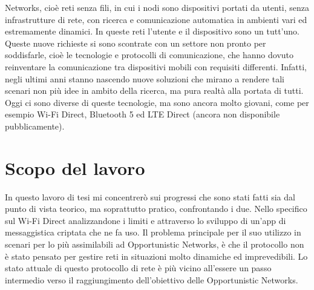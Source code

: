 Networks, cioè reti senza fili, in cui i nodi sono dispositivi portati da utenti, senza
infrastrutture di rete, con ricerca e comunicazione automatica in ambienti vari ed
estremamente dinamici. In queste reti l’utente e il dispositivo sono un tutt’uno.
Queste nuove richieste si sono scontrate con un settore non pronto per soddisfarle,
cioè le tecnologie e protocolli di comunicazione, che hanno dovuto reinventare la
comunicazione tra dispositivi mobili con requisiti differenti. Infatti, negli ultimi anni
stanno nascendo nuove soluzioni che mirano a rendere tali scenari non più idee in
ambito della ricerca, ma pura realtà alla portata di tutti. Oggi ci sono diverse di
queste tecnologie, ma sono ancora molto giovani, come per esempio Wi-Fi Direct,
Bluetooth 5 ed LTE Direct (ancora non disponibile pubblicamente).


\section{Scopo del lavoro}

In questo lavoro di tesi mi concentrerò sui progressi
che sono stati fatti sia dal punto di vista teorico,
ma soprattutto pratico, confrontando i due.
Nello specifico sul Wi-Fi Direct analizzandone i limiti e attraverso lo sviluppo
di un'app di messaggistica criptata che ne fa uso.
Il problema principale per il suo utilizzo in scenari per lo
più assimilabili ad Opportunistic Networks, è che il protocollo non è stato pensato per
gestire reti in situazioni molto dinamiche ed imprevedibili. Lo stato attuale di questo
protocollo di rete è più vicino all’essere un passo intermedio verso il raggiungimento
dell’obiettivo delle Opportunistic Networks.




